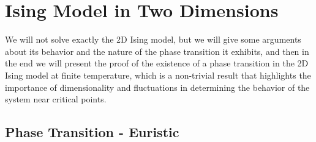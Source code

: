 \section{Ising Model in Two Dimensions}

We will not solve exactly the 2D Ising model, but we will give some arguments about its behavior and the nature of the phase transition it exhibits, and then in the end we will present the proof of the existence of a phase transition in the 2D Ising model at finite temperature, which is a non-trivial result that highlights the importance of dimensionality and fluctuations in determining the behavior of the system near critical points.

\subsection{Phase Transition - Euristic}


